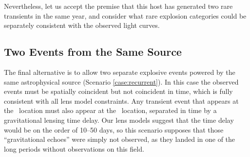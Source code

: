 


Nevertheless, let us accept the premise that this host has generated
two rare transients in the same year, and consider what rare
explosion categories could be separately consistent with the observed
light curves.




\subsection{Two Events from the Same Source}

The final alternative is to allow two separate explosive events
powered by the same astrophysical source (Scenario
\ref{case:recurrent}).  In this case the observed events must be
spatially coincident but not coincident in time, which is fully
consistent with all lens model constraints.  Any transient event that
appears at the \spockone\ location must also appear at the
\spocktwo\ location, separated in time by a gravitational lensing time
delay.  Our lens models suggest that the time delay would be on the
order of 10--50 days, so this scenario supposes that those
``gravitational echoes'' were simply not observed, as they landed in
one of the long periods without \HST observations on this field.





